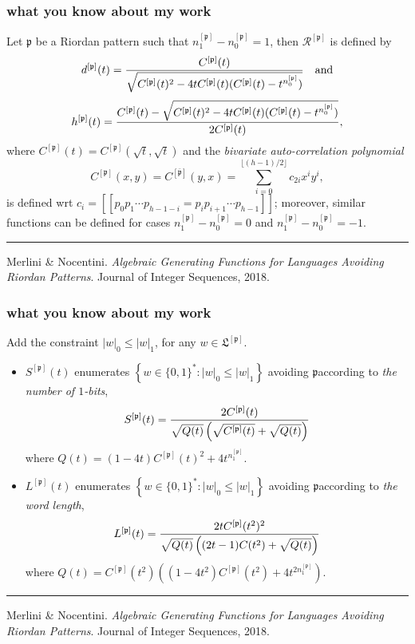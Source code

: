 \documentclass[9pt]{beamer}
\begin{document}
\begin{frame}[fragile]
\frametitle{what you know about my work}

Let $\mathfrak{p}$ be a Riordan pattern
such that $n_1^{[\mathfrak{p}]}-n_0^{[\mathfrak{p}]}=1$, then
$\mathcal{R}^{\left[\mathfrak{p}\right]}$ is defined by
$$d^{[\mathfrak{p}]}(t)={C^{[\mathfrak{p}]}(t)
\over \sqrt{C^{[\mathfrak{p}]}(t)^2-4tC^{[\mathfrak{p}]}(t)(C^{[\mathfrak{p}]}(t)-t^{n_0^{[\mathfrak{p}]}})}}\quad\text{and}$$
$$h^{[\mathfrak{p}]}(t)={C^{[\mathfrak{p}]}(t) -\sqrt{C^{[\mathfrak{p}]}(t)^2-4tC^{[\mathfrak{p}]}(t)(C^{[\mathfrak{p}]}(t)-t^{n_0^{[\mathfrak{p}]}})}
\over 2 C^{[\mathfrak{p}]}(t)},$$
where $C^{[\mathfrak{p}]}(t)=C^{[\mathfrak{p}]}(\sqrt{t},\sqrt{t})$
and the \textit{bivariate auto-correlation polynomial}
\begin{displaymath}
C^{[\mathfrak{p}]}(x,y)=C^{[\mathfrak{\bar{p}}]}(y,x)=\sum_{i=0}^{\lfloor(h-1)/2\rfloor}c_{2i}x^iy^i,
\end{displaymath}
is defined wrt $c_i=[\![p_0p_1\cdots p_{h-1-i}=p_{i}p_{i+1}\cdots p_{h-1}]\!]$;
moreover, similar functions can be defined for cases
$n_1^{[\mathfrak{p}]}-n_0^{[\mathfrak{p}]}=0$ and
$n_1^{[\mathfrak{p}]}-n_0^{[\mathfrak{p}]}=-1$.

\vfill
\noindent\rule{\textwidth}{0.1pt}
{\footnotesize
Merlini \& Nocentini. \textit{Algebraic Generating Functions for Languages
Avoiding Riordan Patterns}.  Journal of Integer Sequences, 2018.}
\end{frame}

\begin{frame}[fragile]
\frametitle{what you know about my work}

Add the constraint $|w|_0\leq |w|_1$, for any $w\in \mathfrak{L}^{[\mathfrak{p}]}$.
\begin{itemize}
\item $S^{[\mathfrak{p}]}(t)$ enumerates $\left\lbrace w\in \lbrace 0,1 \rbrace^{*}:
|w|_0\leq |w|_1\right\rbrace$ avoiding $\mathfrak{p}$\newline according to
\textit{the number of $1$-bits},
$$S^{[\mathfrak{p}]}(t)={2C^{[\mathfrak{p}]}(t) \over \sqrt{Q(t)}\left(\sqrt{C^{[\mathfrak{p}]}(t)}+ \sqrt{Q(t)} \right)} $$
    where $Q(t)={(1-4t)C^{[\mathfrak{p}]}(t)^2+4t^{n_1^{[\mathfrak{p}]}}}.$
\item $L^{[\mathfrak{p}]}(t)$ enumerates $\left\lbrace w\in \lbrace 0,1 \rbrace^{*}:
|w|_0\leq |w|_1\right\rbrace$ avoiding $\mathfrak{p}$\newline according to
\textit{the word length},
$$L^{[\mathfrak{p}]}(t)= {2tC^{[\mathfrak{p}]}(t^2)^2 \over \sqrt{Q(t)}\left((2t-1)C(t^2)+ \sqrt{ Q(t) } \right)}$$
where $Q(t)=C^{[\mathfrak{p}]}(t^2)\left( (1-4t^2)C^{[\mathfrak{p}]}(t^2)+4t^{2n_1^{[\mathfrak{p}]}}\right).$
\end{itemize}
\vfill
\noindent\rule{\textwidth}{0.1pt}
{\footnotesize
Merlini \& Nocentini. \textit{Algebraic Generating Functions for Languages
Avoiding Riordan Patterns}.  Journal of Integer Sequences, 2018.}
\end{frame}
\end{document}
